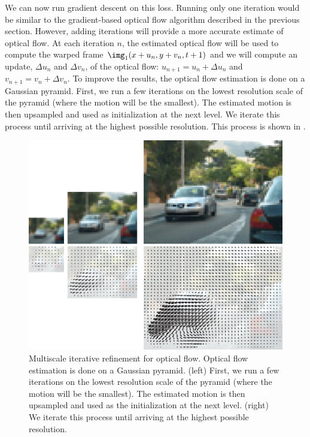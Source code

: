 We can now run gradient descent on this loss. Running only one iteration would be similar to the gradient-based optical flow algorithm described in the previous section. However, adding iterations will provide a more accurate estimate of optical flow. At each iteration $n$, the estimated optical flow will be used to compute the warped frame $\img_1 (x+u_n,y+v_n,t+1)$ and we will compute an update, $\Delta u_n$ and $\Delta v_n$, of the optical flow: $u_{n+1} = u_n+\Delta u_n$ and $v_{n+1}= v_n + \Delta v_n$. To improve the results, the optical flow estimation is done on a Gaussian pyramid. First, we run a few iterations on the lowest resolution scale of the pyramid (where the motion will be the smallest). The estimated motion is then upsampled and used as initialization at the next level. We iterate this process until arriving at the highest possible resolution. This process is shown in \fig{\ref{fig:multiscale_iterative_optical_flow}}.


\begin{figure}[t]
    \centerline{
        \includegraphics[width=1\linewidth]{figures/optical_flow/multiscale_iterative_optical_flow.eps}}
    \caption{Multiscale iterative refinement for optical flow. Optical flow estimation is done on a Gaussian pyramid. (left) First, we run a few iterations on the lowest resolution scale of the pyramid (where the motion will be the smallest). The estimated motion is then upsampled and used as the initialization at the next level. (right) We iterate this process until arriving at the highest possible resolution.}
    \label{fig:multiscale_iterative_optical_flow}
\end{figure}

